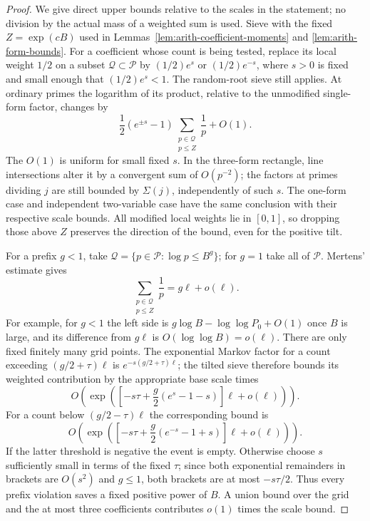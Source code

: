 \begin{proof}
We give direct upper bounds relative to the scales in the statement; no
division by the actual mass of a weighted sum is used.
Sieve with the fixed $Z=\exp(cB)$ used in
Lemmas~\ref{lem:arith-coefficient-moments} and
\ref{lem:arith-form-bounds}.  For a coefficient whose count is being tested,
replace its local weight $1/2$ on a subset $\mathcal Q\subset\mathcal P$ by
$(1/2)e^s$ or $(1/2)e^{-s}$, where $s>0$ is fixed and small enough that
$(1/2)e^s<1$.  The random-root sieve still applies.  At ordinary primes the
logarithm of its product, relative to the unmodified single-form factor,
changes by
\[
 \frac12(e^{\pm s}-1)\sum_{\substack{p\in\mathcal Q\\p\le Z}}\frac1p+O(1).
\]
The $O(1)$ is uniform for small fixed $s$.  In the three-form rectangle,
line intersections alter it by a convergent sum of $O(p^{-2})$;
the factors at primes dividing $j$ are still bounded by $\Sigma(j)$,
independently of such $s$.  The one-form case and independent two-variable
case have the same conclusion with their respective scale bounds.
All modified local weights lie in $[0,1]$, so dropping those above $Z$
preserves the direction of the bound, even for the positive tilt.

For a prefix $g<1$, take
$\mathcal Q=\{p\in\mathcal P:\log p\le B^g\}$; for $g=1$ take all of
$\mathcal P$.  Mertens' estimate gives
\[
 \sum_{\substack{p\in\mathcal Q\\p\le Z}}\frac1p=g\ell+o(\ell).
\]
For example, for $g<1$ the left side is
$g\log B-\log\log P_0+O(1)$ once $B$ is large, and its difference from
$g\ell$ is $O(\log\log B)=o(\ell)$.  There are only fixed finitely many
grid points.  The exponential Markov factor for a count exceeding
$(g/2+\tau)\ell$ is $e^{-s(g/2+\tau)\ell}$; the tilted sieve therefore
bounds its weighted contribution by the appropriate base scale times
\[
 O\left(\exp\left(
  \left[-s\tau+\frac g2(e^s-1-s)\right]\ell+o(\ell)\right)\right).
\]
For a count below $(g/2-\tau)\ell$ the corresponding bound is
\[
 O\left(\exp\left(
  \left[-s\tau+\frac g2(e^{-s}-1+s)\right]\ell+o(\ell)\right)\right).
\]
If the latter threshold is negative the event is empty.  Otherwise choose
$s$ sufficiently small in terms of the fixed $\tau$; since both exponential
remainders in brackets are $O(s^2)$ and $g\le1$, both brackets are at most
$-s\tau/2$.  Thus every prefix violation saves a fixed positive power of
$B$.  A union bound over the grid and the at most three coefficients
contributes $o(1)$ times the scale bound.


\end{proof}
